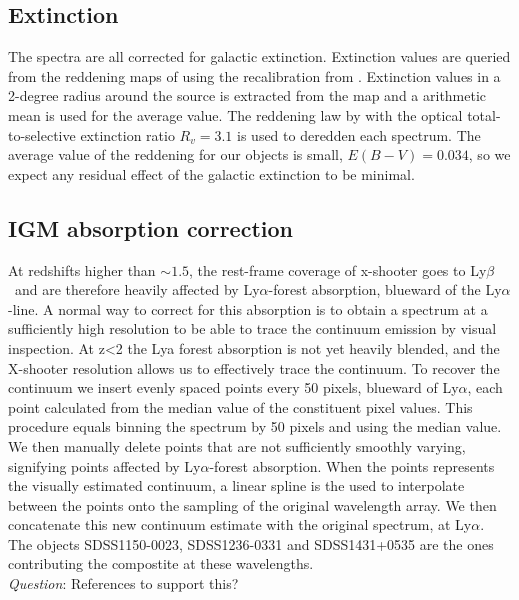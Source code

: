 \documentclass{aa}    %
\newcommand{\sectlabel}[1]{\label{sect:#1}}
\newcommand{\lya}{Ly$\alpha$}
\newcommand{\lyb}{Ly$\beta$}
\newcommand{\todo}[3]{{\color{#2}\emph{#1}: #3}}
\newcommand{\qtodo}[1]{\todo{\\ Question}{red}{#1}}
\begin{document}
\subsection{Extinction} \sectlabel{extinct}

The spectra are all corrected for galactic extinction. Extinction values are queried from the reddening maps of \citep{Schlegel1998} using the recalibration from \citep{Schlafly2011}. Extinction values in a 2-degree radius around the source is extracted from the map and a arithmetic mean is used for the average value. The reddening law by \citep{Fitzpatrick1999} with the optical total-to-selective extinction ratio $R_v = 3.1$ is used to deredden each spectrum. The average value of the reddening for our objects is small, $E(B-V) = 0.034$, so we expect any residual effect of the galactic extinction to be minimal. 


\subsection{IGM absorption correction} \sectlabel{igm}

At redshifts higher than $\sim1.5$, the rest-frame coverage of x-shooter goes to \lyb~and are therefore heavily affected by \lya-forest absorption, blueward of the \lya-line. A normal way to correct for this absorption is to obtain a spectrum at a sufficiently high resolution to be able to trace the continuum emission by visual inspection. At z<2 the Lya forest absorption is not yet heavily blended, and the X-shooter resolution allows us to effectively trace the continuum. To recover the continuum we insert evenly spaced points every 50 pixels, blueward of \lya, each point calculated from the median value of the constituent pixel values. This procedure equals binning the spectrum by 50 pixels and using the median value. We then manually delete points that are not sufficiently smoothly varying, signifying points affected by \lya-forest absorption. When the points represents the visually estimated continuum, a linear spline is the used to interpolate between the points onto the sampling of the original wavelength array. We then concatenate this new continuum estimate with the original spectrum, at \lya. The objects SDSS1150-0023, SDSS1236-0331 and SDSS1431+0535 are the ones contributing the compostite at these wavelengths. \qtodo{References to support this?}
\end{document}
